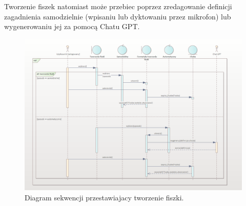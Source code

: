\indent Tworzenie fiszek natomiast może przebiec poprzez zredagowanie definicji zagadnienia samodzielnie (wpisaniu lub dyktowaniu przez mikrofon) lub wygenerowaniu jej za pomocą Chatu GPT.

    \begin{figure}[H]
    \centering
    \includegraphics[width=1\textwidth]{chapters/chapter_6/diagram_sekwencji_2}
    \caption{Diagram sekwencji przestawiajacy tworzenie fiszki.}
    \label{img:diagram_sekwencji_2}
\end{figure}




    


